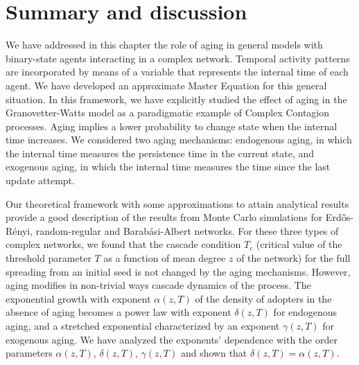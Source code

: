 \section{\label{sec:Summary and Conclusions} Summary and discussion}

We have addressed in this chapter the role of aging in general models with binary-state agents interacting in a complex network. Temporal activity patterns are incorporated by means of a variable that represents the internal time of each agent. We have developed an approximate Master Equation for this general situation. In this framework, we have explicitly studied the effect of aging in the Granovetter-Watts model as a paradigmatic example of Complex Contagion processes. Aging implies a lower probability to change state when the internal time increases. We considered  two aging mechanisms: endogenous aging, in which the internal time measures the persistence time in the current state, and exogenous aging, in which the internal time measures the time since the last update attempt.


Our theoretical framework with some approximations to attain analytical results provide a good description of the results from Monte Carlo simulations for Erd\H{o}s-R\'enyi, random-regular and Barab\'asi-Albert networks. For these three types of complex networks, we found that the cascade condition $T_c$ (critical value of the threshold parameter $T$ as a function of mean degree $z$ of the network) for the full spreading from an initial seed is not changed by the aging mechanisms. However, aging modifies in non-trivial ways cascade dynamics of the process. The exponential growth with exponent $\alpha(z,T)$ of the density of adopters in the absence of aging becomes a power law with exponent $\delta(z,T)$ for endogenous aging, and a stretched exponential characterized by an exponent $\gamma(z,T)$ for exogenous aging. We have analyzed the exponents' dependence with the order parameters $\alpha(z,T)$, $\delta(z,T)$, $\gamma(z,T)$ and shown that $\delta(z,T)=\alpha(z,T)$.

